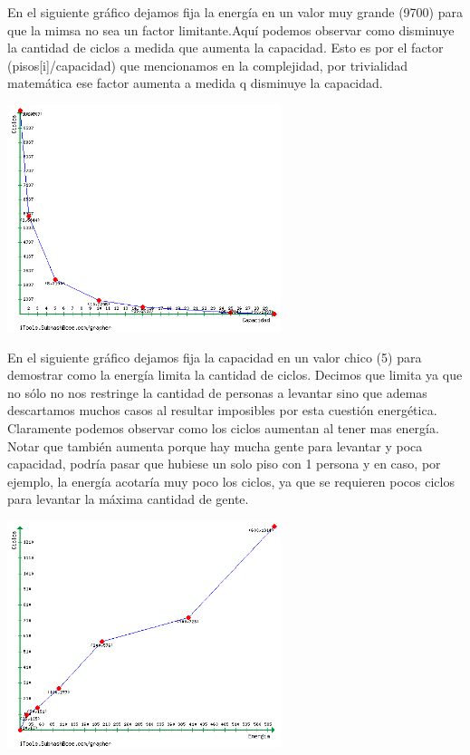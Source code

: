 En el siguiente gráfico dejamos fija la energía en un valor muy grande (9700) para que la mimsa no sea un factor limitante.Aquí podemos observar como disminuye la cantidad de ciclos a medida que aumenta la capacidad. Esto es por el factor (pisos[i]/capacidad) que mencionamos en la complejidad, por trivialidad matemática ese factor aumenta a medida q disminuye la capacidad. \\
\begin {center}
\includegraphics[width=8cm]{./graficos/grafico_ej1_variaCapacidad.png}
\end {center} 

En el siguiente gráfico dejamos fija la capacidad en un valor chico (5) para demostrar como la energía limita la cantidad de ciclos. Decimos que limita ya que no sólo no nos restringe la cantidad de personas a levantar sino que ademas descartamos muchos casos al resultar imposibles por esta cuestión energética.\\
Claramente podemos observar como los ciclos aumentan al tener mas energía. Notar que también aumenta porque hay mucha gente para levantar y poca capacidad, podría pasar que hubiese un solo piso con 1 persona y en caso, por ejemplo, la energía acotaría muy poco los ciclos, ya que se requieren pocos ciclos para levantar la máxima cantidad de gente.
\begin {center}
\includegraphics[width=8cm]{./graficos/grafico_variaEnergia.png}
\end {center} 


